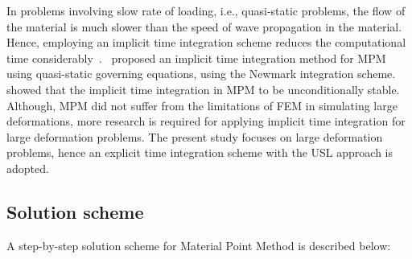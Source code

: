 In problems involving slow rate of loading, i.e., quasi-static problems, the 
flow of the material is much slower than the speed of wave propagation in the 
material. Hence, employing an implicit time integration scheme reduces the 
computational time considerably~\citep{Kafaji2013}.~\citet{Guilkey2003a} 
proposed an implicit time integration method for MPM using quasi-static 
governing equations, using the Newmark integration scheme.~\citet{Love2006} 
showed that the implicit time integration in MPM to be unconditionally stable. 
Although, MPM did not suffer from the limitations of FEM in simulating large 
deformations, more research is required for applying implicit time integration 
for large deformation problems. The present study focuses on large deformation 
problems, hence an explicit time integration scheme with the USL approach is 
adopted.

\subsection{Solution scheme}
A step-by-step solution scheme for Material Point Method is described below:

